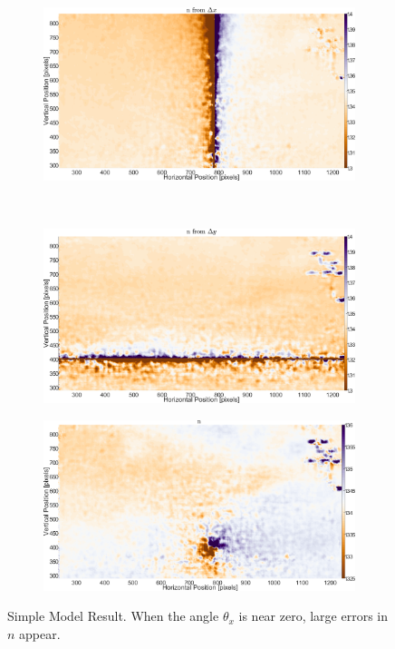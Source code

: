 \documentclass{article}
\begin{document}
\begin{figure}[htbp]
\begin{subfigure}{.5\linewidth}
	\label{fig:DYsimplefrontal}
\end{subfigure}%
\begin{subfigure}{.5\linewidth}
	\centering \includegraphics[width = \textwidth]{nfromdxsimplefrontal}
	\label{fig:nfromdxsimplefrontal}
\end{subfigure}\\
\begin{subfigure}{.5\linewidth}
	\centering \includegraphics[width = \textwidth]{nfromdysimplefrontal}
	\label{fig:nfromdysimplefrontal}
\end{subfigure}%
\begin{subfigure}{.5\linewidth}
	\centering \includegraphics[width = \textwidth]{nsimplefrontal}
	\label{fig:nfrontal}
\end{subfigure}
\caption{Simple Model Result. When the angle $\theta_x$ is near zero, large errors in $n$ appear. }
\label{fig:simmod}
\end{figure}
\end{document}
